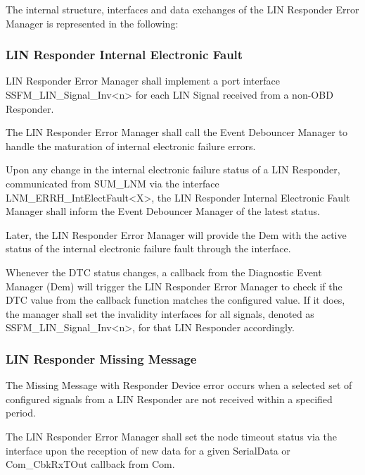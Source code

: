 The internal structure, interfaces and data exchanges of the LIN Responder Error Manager is represented in the following:

\subsubsection{LIN Responder Internal Electronic Fault}
\label{subsec:Lin_Resp_IeF_Manager}
LIN Responder Error Manager shall implement a port interface SSFM_LIN_Signal_Inv<n> for each LIN Signal received from a non-OBD Responder.

The LIN Responder Error Manager shall call the Event Debouncer Manager to handle the maturation of internal electronic failure errors.

Upon any change in the internal electronic failure status of a LIN Responder, communicated from SUM_LNM via the interface LNM_ERRH_IntElectFault<X>, the LIN Responder Internal Electronic Fault Manager shall inform the Event Debouncer Manager of the latest status.

Later, the LIN Responder Error Manager will provide the Dem with the active status of the internal electronic failure fault through the  interface.

Whenever the DTC status changes, a callback from the Diagnostic Event Manager (Dem) will trigger the LIN Responder Error Manager
to check if the DTC value from the callback function matches the configured value. If it does, the manager shall set the invalidity interfaces for all signals, denoted as SSFM_LIN_Signal_Inv<n>, for that LIN Responder accordingly.

{  }

\subsubsection{LIN Responder Missing Message}
\label{subsec:Lin_Resp_MissingMsg_Manager}
The Missing Message with Responder Device error occurs when a selected set of configured signals from a LIN Responder are not received within a specified period. 

The LIN Responder Error Manager shall set the node timeout status via the interface  upon the reception of new data for a given SerialData or Com_CbkRxTOut callback from Com.

